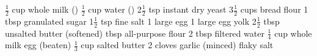 \dishtype{\bread}
\dishother{\vegetarian}
\begin{ingreds}
    \ingredients[Dough]
        $\frac{1}{2}$ cup whole milk ()
        $\frac{1}{2}$ cup water ()
        2$\frac{1}{2}$ tsp instant dry yeast
        3$\frac{1}{2}$ cups bread flour
        1 tbsp granulated sugar
        1$\frac{1}{2}$ tsp fine salt
        1 large egg
        1 large egg yolk
        2$\frac{1}{2}$ tbsp unsalted butter (softened)
    \columnbreak{}
     tbsp all-purpose flour
        2 tbsp filtered water
        $\frac{1}{4}$ cup whole milk
     egg (beaten)
        $\frac{1}{3}$ cup salted butter
        2 cloves garlic (minced)
        flaky salt
\end{ingreds}
